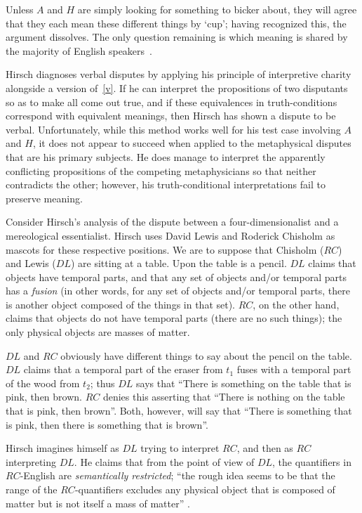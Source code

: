 \documentclass[11pt]{article}
\begin{document}
\begin{spacing}{1.25}
Unless $A$ and $H$ are simply looking for something to bicker about,
they will agree that they each mean these different things by `cup';
having recognized this, the argument dissolves.  The only question
remaining is which meaning is shared by the majority of English
speakers~\citep[70]{hirsch2005}.

Hirsch diagnoses verbal disputes by applying his principle of
interpretive charity alongside a version of~\ref{v}.  If he can
interpret the propositions of two disputants so as to make all come
out true, and if these equivalences in truth-conditions correspond
with equivalent meanings, then Hirsch has shown a dispute to be
verbal.  Unfortunately, while this method works well for his test case
involving $A$ and $H$, it does not appear to succeed when applied to
the metaphysical disputes that are his primary subjects.  He does
manage to interpret the apparently conflicting propositions of the
competing metaphysicians so that neither contradicts the other;
however, his truth-conditional interpretations fail to preserve
meaning.

Consider Hirsch's analysis of the dispute between a
four-dimensionalist and a mereological essentialist.  Hirsch uses
David Lewis and Roderick Chisholm as mascots for these respective
positions.  We are to suppose that Chisholm ($RC$) and Lewis ($DL$)
are sitting at a table.  Upon the table is a pencil. $DL$ claims that
objects have temporal parts, and that any set of objects and/or
temporal parts has a {\em fusion} (in other words, for any set of
objects and/or temporal parts, there is another object composed of the
things in that set).  $RC$, on the other hand, claims that objects do
not have temporal parts (there are no such things); the only physical
objects are masses of matter.

$DL$ and $RC$ obviously have different things to say about the pencil
on the table.  $DL$ claims that a temporal part of the eraser from
$t_{1}$ fuses with a temporal part of the wood from $t_{2}$; thus $DL$
says that ``There is something on the table that is pink, then brown.
$RC$ denies this asserting that ``There is nothing on the table that
is pink, then brown''.  Both, however, will say that ``There is
something that is pink, then there is something that is brown''.

Hirsch imagines himself as $DL$ trying to interpret $RC$, and then as
$RC$ interpreting $DL$.  He claims that from the point of view of
$DL$, the quantifiers in $RC$-English are {\em semantically
  restricted}; ``the rough idea seems to be that the range of the
$RC$-quantifiers excludes any physical object that is composed of
matter but is not itself a mass of matter'' \citep[76]{hirsch2005}.


\end{spacing}
\end{document}
